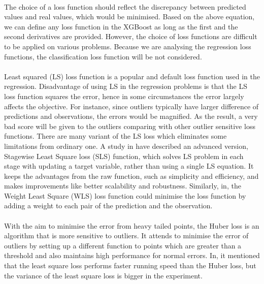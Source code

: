 \documentclass[runningheads]{llncs}
\begin{document}
\paragraph{}The choice of a loss function should reflect the discrepancy between predicted values and real values, which would be minimised. Based on the above equation, we can define any loss function in the XGBoost as long as the first and the second derivatives are provided. However, the choice of loss functions are difficult to be applied on various problems. Because we are analysing the regression loss functions, the classification loss function will be not considered.

\paragraph{} Least squared (LS) loss function is a popular and default loss function used in the regression. Disadvantage of using LS in the regression problems is that the LS loss function squares the error, hence in some circumstances the error largely affects the objective. For instance, since outliers typically have larger difference of predictions and observations, the errors would be magnified. As the result, a very bad score will be given to the outliers comparing with other outlier sensitive loss functions. There are many variant of the LS loss which eliminates some limitations from ordinary one. A study in have described an advanced version, Stagewise Least Square loss (SLS) function, which solves LS problem in each stage with updating a target variable, rather than using a single LS equation. It keeps the advantages from the raw function, such as simplicity and efficiency, and makes improvements like better scalability and robustness. Similarly, in, the Weight Least Square (WLS) loss function could minimise the loss function by adding a weight to each pair of the prediction and the observation.

\paragraph{}With the aim to minimise the error from heavy tailed points, the Huber loss is an algorithm that is more sensitive to outliers. It attends to minimise the error of outliers by setting up a different function to points which are greater than a threshold and also maintains high performance for normal errors. In, it mentioned that the least square loss performs faster running speed than the Huber loss, but the variance of the least square loss is bigger in the experiment.
\end{document}
